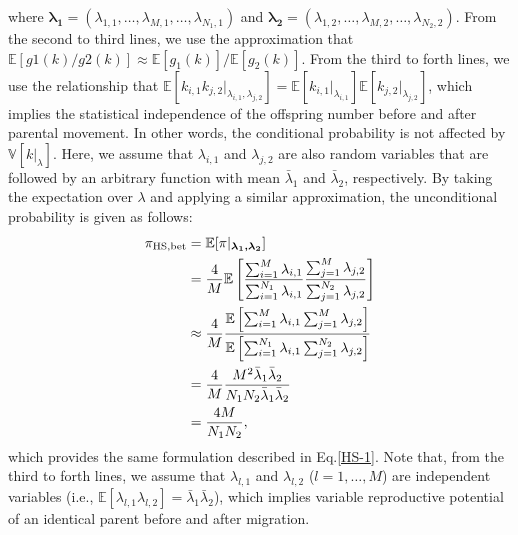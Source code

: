 \documentclass[12pt, English]{article}
\begin{document}
\begin{spacing}{1.9}
where $\boldsymbol{\lambda_1}=(\lambda_{1,1}, \ldots, \lambda_{M,1}, \ldots, \lambda_{N_1,1})$ and $\boldsymbol{\lambda_2}=(\lambda_{1,2}, \ldots, \lambda_{M,2}, \ldots, \lambda_{N_2,2})$. From the second to third lines, we use the approximation that $\mathbb{E}[g1(k)/g2(k)] \approx \mathbb{E}[g_1(k)] / \mathbb{E}[g_2(k)]$. From the third to forth lines, we use the relationship that $\mathbb{E}[k_{i,1}k_{j,2} | _{\lambda_{i,1}, \lambda_{j,2}}] = \mathbb{E}[k_{i,1}|_{\lambda_{i,1}}]\mathbb{E}[k_{j,2}|_{\lambda_{j,2}}]$, which implies the statistical independence of the offspring number before and after parental movement. In other words, the conditional probability is not affected by $\mathbb{V}[k|_\lambda]$. Here, we assume that $\lambda_{i,1}$ and $\lambda_{j,2}$ are also random variables that are followed by an arbitrary function with mean ${\bar \lambda_{1}}$ and ${\bar \lambda_{2}}$, respectively. By taking the expectation over $\lambda$ and applying a similar approximation, the unconditional probability is given as follows:
\begin{align}
\pi_{\rm HS,bet} &= \mathbb{E}[\pi | _{\boldsymbol{\lambda_1, \lambda_2}}] \nonumber\\ 
&= \frac{4}{M} \mathbb{E}\left[\frac{ \sum_{i=1}^M \lambda_{i,1} } { \sum_{i=1}^{N_1} \lambda_{i,1} } \frac{ \sum_{j=1}^M \lambda_{j,2} } { \sum_{j=1}^{N_2} \lambda_{j,2} } \right]   \nonumber\\
&\approx \frac{4}{M} \frac{ \mathbb{E}\left[ \sum_{i=1}^M \lambda_{i,1} \sum_{j=1}^M \lambda_{j,2} \right] } {\mathbb{E}\left[ \sum_{i=1}^{N_1} \lambda_{i,1} \sum_{j=1}^{N_2} \lambda_{j,2}\right]} \nonumber\\
&= \frac{4}{M} \frac{M^2 {\bar \lambda_1} {\bar \lambda_2}}{N_1 N_2 {\bar \lambda_1} {\bar \lambda_2}}\nonumber\\
&= \frac{4M}{N_{1}N_{2}},
\label{App2}
\end{align}
which provides the same formulation described in Eq.\ref{HS-1}. Note that, from the third to forth lines, we assume that $\lambda_{l,1}$ and $\lambda_{l,2}$ ($l = 1, \ldots, M$) are independent variables (i.e., $\mathbb{E}[\lambda_{l,1}\lambda_{l,2}] = {\bar \lambda_{1}}{\bar \lambda_{2}}$), which implies variable reproductive potential of an identical parent before and after migration. 


\end{spacing}
\end{document}
